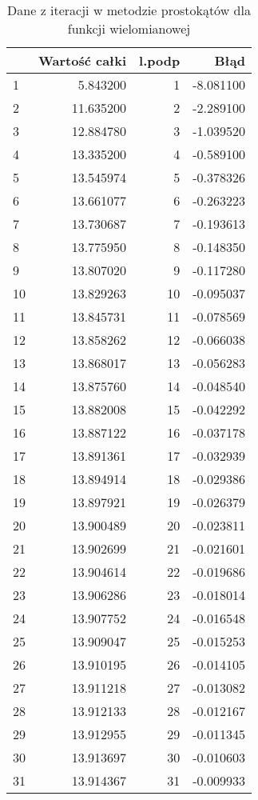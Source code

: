 \documentclass[12pt,twoside]{article}
\begin{document}
\begin{table}[H]
\centering 
\caption{Dane z iteracji w metodzie prostokątów dla funkcji wielomianowej}
\label{tabela1.1}
\begin{tabular}{lrrr}
\toprule
{} &  Wartość całki &  l.podp &      Błąd \\
\midrule
1  &       5.843200 &       1 & -8.081100 \\
2  &      11.635200 &       2 & -2.289100 \\
3  &      12.884780 &       3 & -1.039520 \\
4  &      13.335200 &       4 & -0.589100 \\
5  &      13.545974 &       5 & -0.378326 \\
6  &      13.661077 &       6 & -0.263223 \\
7  &      13.730687 &       7 & -0.193613 \\
8  &      13.775950 &       8 & -0.148350 \\
9  &      13.807020 &       9 & -0.117280 \\
10  &      13.829263 &      10 & -0.095037 \\
11 &      13.845731 &      11 & -0.078569 \\
12 &      13.858262 &      12 & -0.066038 \\
13 &      13.868017 &      13 & -0.056283 \\
14 &      13.875760 &      14 & -0.048540 \\
15 &      13.882008 &      15 & -0.042292 \\
16 &      13.887122 &      16 & -0.037178 \\
17 &      13.891361 &      17 & -0.032939 \\
18 &      13.894914 &      18 & -0.029386 \\
19 &      13.897921 &      19 & -0.026379 \\
20 &      13.900489 &      20 & -0.023811 \\
21 &      13.902699 &      21 & -0.021601 \\
22 &      13.904614 &      22 & -0.019686 \\
23 &      13.906286 &      23 & -0.018014 \\
24 &      13.907752 &      24 & -0.016548 \\
25 &      13.909047 &      25 & -0.015253 \\
26 &      13.910195 &      26 & -0.014105 \\
27 &      13.911218 &      27 & -0.013082 \\
28 &      13.912133 &      28 & -0.012167 \\
29 &      13.912955 &      29 & -0.011345 \\
30 &      13.913697 &      30 & -0.010603 \\
31 &      13.914367 &      31 & -0.009933 \\
\bottomrule
\end{tabular}
\end{table}
\end{document}
